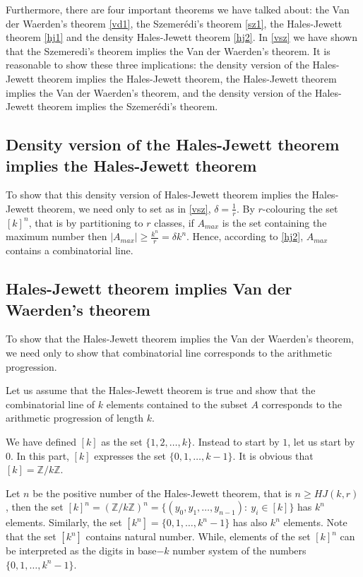 Furthermore, there are four important theorems we have talked about: the Van der Waerden's theorem \eqref{vd1}, the Szemerédi's theorem \eqref{sz1}, the  Hales-Jewett theorem \eqref{hj1} and the density Hales-Jewett theorem \eqref{hj2}. 
In \eqref{vsz} we have shown that the Szemeredi's theorem implies the Van der Waerden's theorem. It is reasonable to show these three implications: the density version of the Hales-Jewett theorem implies the Hales-Jewett theorem, the Hales-Jewett theorem implies the  Van der Waerden's theorem, and the density version of the Hales-Jewett theorem implies the Szemerédi's theorem.

\subsection{Density version of the Hales-Jewett theorem implies the Hales-Jewett theorem}

To show that this density version of Hales-Jewett theorem implies the Hales-Jewett theorem, we need only to set as in  \eqref{vsz}, $\delta=\frac{1}{r}.$ By $r$-colouring the set $[k]^n$, that is by partitioning to $r$ classes,  if $A_{max}$ is the set containing the maximum number then $|A_{max}| \geq \frac{k^n}{r}=\delta k^n.$ Hence, according to \eqref{hj2}, $A_{max}$ contains a combinatorial line.

\subsection{Hales-Jewett theorem implies Van der Waerden's theorem}

To show that the Hales-Jewett theorem implies the Van der Waerden's theorem, we need only to show that combinatorial line corresponds to the arithmetic progression.

Let us  assume that the Hales-Jewett theorem is true and show that the combinatorial line of $k$ elements contained to the subset $A$ corresponds to the arithmetic progression of length $k$.

We have defined $[k]$ as the set $\{1,2,\ldots, k\}.$ Instead to start by $1$, let us start by $0.$ In this part, $[k]$ expresses the set $\{0,1,\ldots, k-1\}.$ It is obvious that $[k]=\mathbb{Z}/k\mathbb{Z}.$

Let $n$ be the positive number of the Hales-Jewett theorem, that is $n\geq HJ(k,r)$, then the set $[k]^n=(\mathbb{Z}/k\mathbb{Z})^n=\{(y_0,y_1, \ldots, y_{n-1}): \ y_i \in [k] \}$ has $k^n$ elements. Similarly, the set $[k^n]=\{0,1,\ldots, k^n-1\}$ has also $k^n$ elements. Note that the set $[k^n]$ contains natural number.
While, elements of the set $[k]^n$ can be interpreted as 
the digits  in base$-k$ number system of the numbers $\{0,1,\ldots,k^n-1\}.$

